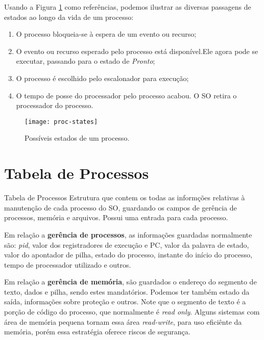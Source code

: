 Usando a Figura \ref{fig:proc-states} como referências, podemos ilustrar as diversas passagens de estados ao longo da vida de um processo:

\begin{enumerate}
  \item O processo bloqueia-se à espera de um evento ou recurso;

  \item O evento ou recurso esperado pelo processo está disponível.Ele agora pode se executar, passando para o estado de \textit{Pronto};

  \item O processo é escolhido pelo escalonador para execução;

  \item O tempo de posse do processador pelo processo acabou. O SO retira o processador do processo.
\end{enumerate}

\begin{figure}[ht]
  \centering
  \texttt{[image: proc-states]}
  \caption{Possíveis estados de um processo.}
  \label{fig:proc-states}
\end{figure}

















\section{Tabela de Processos}
\begin{definicao}{Tabela de Processos}
  Estrutura que contem os todas as informções relativas à manutenção de cada processo do SO, guardando os campos de gerência de processos, memória e arquivos. Possui uma entrada para cada processo.
\end{definicao}

Em relação a \textbf{gerência de processos}, as informações guardadas normalmente são: \textit{pid}, valor dos registradores de execução e PC, valor da palavra de estado, valor do apontador de pilha, estado do processo, instante do início do processo, tempo de processador utilizado e outros.

Em relação a \textbf{gerência de memória}, são guardados o endereço do segmento de texto, dados e pilha, sendo estes mandatórios. Podemos ter também estado da saída, informações sobre proteção e outros. Note que o segmento de texto é a porção de código do processo, que normalmente é \textit{read only}. Alguns sistemas com área de memória pequena tornam essa área \textit{read-write}, para uso eficiênte da memória, porém essa estratégia oferece riscos de segurança.

